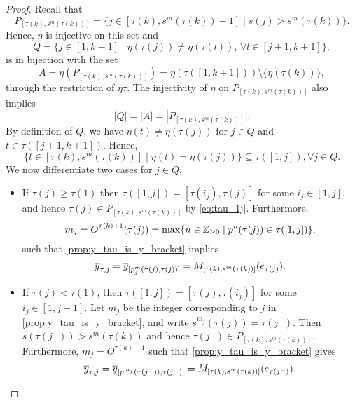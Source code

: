 \begin{proof}
	Recall that
	\begin{equation*}
		P_{[\tau(k), s^m(\tau(k))]} = \{j \in [\tau(k), s^m(\tau(k)) -1] \mid s(j) > s^m(\tau(k))\}.
	\end{equation*}
	Hence, $\eta$ is injective on this set and
	\begin{equation*}
		Q = \{j \in [1, k-1] \mid \eta(\tau(j)) \neq \eta(\tau(l)),\, \forall l \in [j+1, k+1]\},
	\end{equation*}
	is in bijection with the set
	\begin{equation*}
		A = \eta(P_{[\tau(k), s^m(\tau(k))]}) = \eta(\tau([1, k+1])) \setminus \{\eta(\tau(k))\},
	\end{equation*}
	through the restriction of $\eta \tau$. The injectivity of $\eta$ on $P_{[\tau(k),
						s^m(\tau(k))]}$ also implies
	\begin{equation*}
		|Q| = |A| = |P_{[\tau(k), s^m(\tau(k))]}|.
	\end{equation*}
	By definition of $Q$, we have $\eta(t) \neq \eta(\tau(j))$ for $j \in Q$ and $t \in
		\tau([j+1, k +1])$. Hence,
	\begin{equation}\label{eq:tau_1j}
		\{t \in [\tau(k), s^m(\tau(k))] \mid \eta(t) = \eta(\tau(j))\} \subseteq \tau([1, j]), \forall j \in Q.
	\end{equation}
	We now differentiate two cases for $j \in Q$.
	\begin{itemize}
		\item If $\tau(j) \geq \tau(1)$ then $\tau([1, j]) = [\tau(i_j), \tau(j)]$ for some $i_j \in
			      [1, j]$, and hence $\tau(j) \in P_{[\tau(k), s^m(\tau(k))]}$ by \cref{eq:tau_1j}.
		      Furthermore,
		      \begin{equation*}
			      m_j = O_{-}^{\tau(k) + 1}(\tau(j)) = \max\{n \in \mathbb{Z}_{\geq 0} \mid p^n (\tau(j)) \in \tau([1, j])\},
		      \end{equation*}
		      such that \cref{prop:y_tau_is_y_bracket} implies
		      \begin{equation*}
			      \overline{y}_{\tau, j} = \overline{y}_{[p^m_j(\tau(j), \tau(j))]} = M_{[\tau(k), s^m(\tau(k))]}(e_{\tau(j)}).
		      \end{equation*}
		\item If $\tau(j) < \tau(1)$, then $\tau([1, j]) = [\tau(j), \tau(i_j)]$ for some $i_j \in
			      [1, j-1]$. Let $m_j$ be the integer corresponding to $j$ in
		      \cref{prop:y_tau_is_y_bracket}, and write $s^{m_j}(\tau(j)) = \tau(j^{-})$. Then
		      $s(\tau(j^{-})) > s^m(\tau(k))$ and hence $\tau(j^{-}) \in P_{[\tau(k),
							      s^m(\tau(k))]}$. Furthermore, $m_j = O_{-}^{\tau(k) + 1}$ such that
		      \cref{prop:y_tau_is_y_bracket} gives
		      \begin{equation*}
			      \overline{y}_{\tau, j} = \overline{y}_{[p^{m_j}(\tau(j^{-})), \tau(j^{-})]} = M_{[\tau(k), s^m(\tau(k))]}(e_{\tau(j^{-})}).
		      \end{equation*}
	\end{itemize}


\end{proof}

